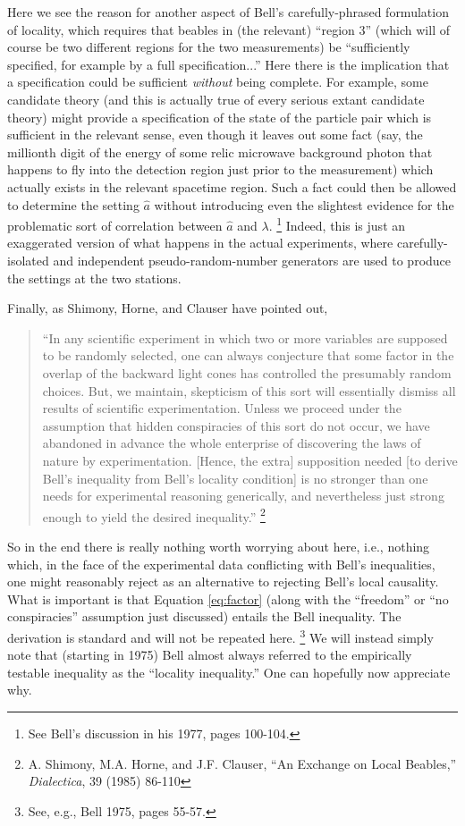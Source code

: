 \documentclass[aps,prc,twocolumn]{revtex4}
\begin{document}
Here we see the
reason for another aspect of Bell's carefully-phrased formulation of 
locality, which requires that beables in (the relevant) ``region 3''
(which will of course be two different regions for the two measurements)
be ``sufficiently specified, for example by a full specification...''
Here there is the implication that a
specification could be sufficient \emph{without} being complete.  For
example, some candidate theory (and this is actually true of every
serious extant candidate theory) might provide a specification of the
state of the particle pair which is sufficient in the relevant sense,
even though it leaves out some fact (say, the millionth digit of the
energy of some relic microwave background photon that happens to
fly into the detection region just prior to the measurement) which
actually exists in the relevant spacetime region.  Such a fact could
then be allowed to determine the setting $\hat{a}$ without introducing
even the slightest evidence for the problematic sort of correlation
between $\hat{a}$ and $\lambda$.  
\footnote{See Bell's discussion in his 1977, pages 100-104.}
Indeed, this is just an exaggerated
version of what happens in the actual experiments, where
carefully-isolated and independent pseudo-random-number generators are
used to produce the settings at the two stations.  

Finally, as Shimony, Horne, and Clauser have pointed out, 
\begin{quote}
``In any scientific experiment
in which two or more variables are supposed to be randomly selected,
one can always conjecture that some factor in the overlap of the
backward light cones has controlled the presumably random choices.
But, we maintain, skepticism of this sort will essentially dismiss all
results of scientific experimentation.  Unless we proceed under the
assumption that hidden conspiracies of this sort do not occur, we have
abandoned in advance the whole enterprise of discovering the laws of
nature by experimentation.   [Hence, the extra] supposition needed [to
derive Bell's inequality from Bell's locality condition] is
no stronger than one needs for experimental reasoning generically, and
nevertheless just strong enough to yield the desired inequality.''  
\footnote{A. Shimony, M.A. Horne, and J.F. Clauser, ``An Exchange on
  Local Beables,'' \emph{Dialectica}, 39 (1985) 86-110}
\end{quote}
So in the end there is really nothing worth worrying about here, i.e.,
nothing which, in the face of the experimental data conflicting with
Bell's inequalities, one might reasonably reject as an alternative to
rejecting Bell's local causality.  What
is important is that Equation \ref{eq:factor} (along with the ``freedom''
or ``no conspiracies'' assumption just discussed) entails the Bell
inequality.
The derivation is standard and will not be repeated here.  
\footnote{See, e.g., Bell 1975, pages 55-57.}
We will instead simply note
that (starting in 1975) Bell almost always referred 
to the empirically testable inequality as the ``locality inequality.''  
One can hopefully now appreciate why.
\end{document}
